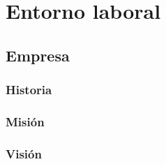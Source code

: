 \documentclass[protocolo.tex]{subfiles}
\begin{document}
\section{Entorno laboral}

\subsection{Empresa}

\subsubsection{Historia}

\subsubsection{Misión}

\subsubsection{Visión}
\end{document}
